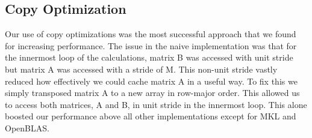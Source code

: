 \subsection{Copy Optimization}
Our use of copy optimizations was the most successful approach that we found
for increasing performance. The issue in the naive implementation was that for
the innermost loop of the calculations, matrix B was accessed with unit stride
but matrix A was accessed with a stride of M. This non-unit stride vastly
reduced how effectively we could cache matrix A in a useful way. To fix this we
simply transposed matrix A to a new array in row-major order.  This allowed us
to access both matrices, A and B, in unit stride in the innermost loop. This
alone boosted our performance above all other implementations except for MKL
and OpenBLAS.
